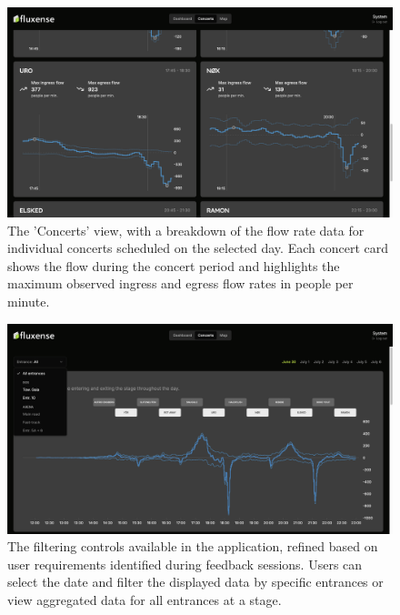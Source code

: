 \begin{figure}[H]
  \centering
  \includegraphics[width=\textwidth]{Pictures/Misc/Frontend/flow_concerts.png}
  \caption{The 'Concerts' view, with a breakdown of the flow rate data for individual concerts scheduled on the selected day. Each concert card shows the flow during the concert period and highlights the maximum observed ingress and egress flow rates in people per minute.}
  \label{fig:showcase:concerts}

\end{figure}

\begin{figure}[H]
  \centering
  \includegraphics[width=\textwidth]{Pictures/Misc/Frontend/entrance_filter.png}
  \caption{The filtering controls available in the application, refined based on user requirements identified during feedback sessions. Users can select the date and filter the displayed data by specific entrances or view aggregated data for all entrances at a stage.}
  \label{fig:showcase:filter}
\end{figure}

